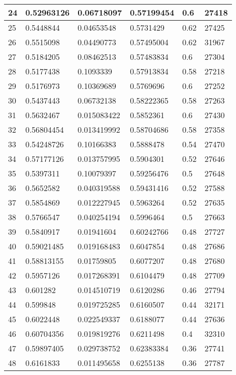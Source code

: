 \begin{longtable}{|l|l|l|l|l|l|}
24 & 0.52963126 & 0.06718097 & 0.57199454 & 0.6 & 27418 \\ \hline 
25 & 0.5448844 & 0.04653548 & 0.5731429 & 0.62 & 27425 \\ \hline 
26 & 0.5515098 & 0.04490773 & 0.57495004 & 0.62 & 31967 \\ \hline 
27 & 0.5184205 & 0.08462513 & 0.57483834 & 0.6 & 27304 \\ \hline 
28 & 0.5177438 & 0.1093339 & 0.57913834 & 0.58 & 27218 \\ \hline 
29 & 0.5176973 & 0.10369689 & 0.5769696 & 0.6 & 27252 \\ \hline 
30 & 0.5437443 & 0.06732138 & 0.58222365 & 0.58 & 27263 \\ \hline 
31 & 0.5632467 & 0.015083422 & 0.5852361 & 0.6 & 27430 \\ \hline 
32 & 0.56804454 & 0.013419992 & 0.58704686 & 0.58 & 27358 \\ \hline 
33 & 0.54248726 & 0.10166383 & 0.5888478 & 0.54 & 27470 \\ \hline 
34 & 0.57177126 & 0.013757995 & 0.5904301 & 0.52 & 27646 \\ \hline 
35 & 0.5397311 & 0.10079397 & 0.59256476 & 0.5 & 27648 \\ \hline 
36 & 0.5652582 & 0.040319588 & 0.59431416 & 0.52 & 27588 \\ \hline 
37 & 0.5854869 & 0.012227945 & 0.5963264 & 0.52 & 27635 \\ \hline 
38 & 0.5766547 & 0.040254194 & 0.5996464 & 0.5 & 27663 \\ \hline 
39 & 0.5840917 & 0.01941604 & 0.60242766 & 0.48 & 27727 \\ \hline 
40 & 0.59021485 & 0.019168483 & 0.6047854 & 0.48 & 27686 \\ \hline 
41 & 0.58813155 & 0.01759805 & 0.6077207 & 0.48 & 27680 \\ \hline 
42 & 0.5957126 & 0.017268391 & 0.6104479 & 0.48 & 27709 \\ \hline 
43 & 0.601282 & 0.014510719 & 0.6120286 & 0.46 & 27794 \\ \hline 
44 & 0.599848 & 0.019725285 & 0.6160507 & 0.44 & 32171 \\ \hline 
45 & 0.6022448 & 0.022549337 & 0.6188077 & 0.44 & 27636 \\ \hline 
46 & 0.60704356 & 0.019819276 & 0.6211498 & 0.4 & 32310 \\ \hline 
47 & 0.59897405 & 0.029738752 & 0.62383384 & 0.36 & 27741 \\ \hline 
48 & 0.6161833 & 0.011495658 & 0.6255138 & 0.36 & 27787 \\ \hline 

\end{longtable}
